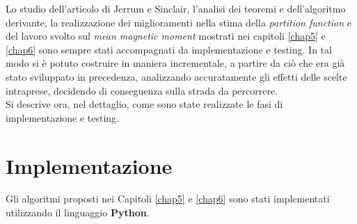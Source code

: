 Lo studio dell'articolo di Jerrum e Sinclair, l'analisi dei teoremi e dell'algoritmo derivante, la realizzazione dei miglioramenti nella stima della \textit{partition function} e del lavoro svolto sul \textit{mean magnetic moment} mostrati nei capitoli \ref{chap5} e \ref{chap6} sono sempre stati accompagnati da implementazione e testing. In tal modo si è potuto costruire in maniera incrementale, a partire da ciò che era già stato sviluppato in precedenza, analizzando accuratamente gli effetti delle scelte intraprese, decidendo di conseguenza sulla strada da percorrere.\\
Si descrive ora, nel dettaglio, come sono state realizzate le fasi di implementazione e testing.
\section{Implementazione}
Gli algoritmi proposti nei Capitoli \ref{chap5} e \ref{chap6} sono stati implementati utilizzando il linguaggio \textbf{Python}.
